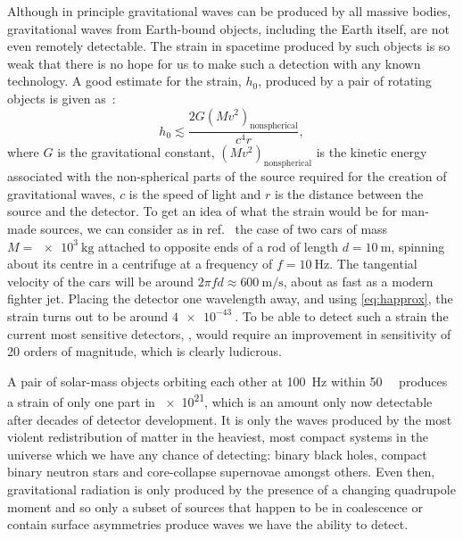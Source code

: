 Although in principle gravitational waves can be produced by all massive bodies, gravitational waves from Earth-bound objects, including the Earth itself, are not even remotely detectable. The strain in spacetime produced by such objects is so weak that there is no hope for us to make such a detection with any known technology. A good estimate for the strain, $h_0$, produced by a pair of rotating objects is given as~\cite{Sathyaprakash2009}:
\begin{equation}
  \label{eq:happrox}
  h_0 \lesssim \frac{2 G \left( M v^{2} \right)_{\text{nonspherical}}}{c^4 r},
\end{equation}
where $G$ is the gravitational constant, $\left( M v^{2} \right)_{\text{nonspherical}}$ is the kinetic energy associated with the non-spherical parts of the source required for the creation of gravitational waves, $c$ is the speed of light and $r$ is the distance between the source and the detector. To get an idea of what the strain would be for man-made sources, we can consider as in ref.~\cite{Sathyaprakash2009} the case of two cars of mass $M = \SI{e3}{\kilo\gram}$ attached to opposite ends of a rod of length $d = \SI{10}{\meter}$, spinning about its centre in a centrifuge at a frequency of $f = \SI{10}{\hertz}$. The tangential velocity of the cars will be around $2 \pi f d \approx \SI{600}{\meter\per\second}$, about as fast as a modern fighter jet. Placing the detector one wavelength away, and using \cref{eq:happrox}, the strain turns out to be around $\SI{4e-43}{}$. To be able to detect such a strain the current most sensitive detectors, \ALIGO{}, would require an improvement in sensitivity of \SI{20}{} orders of magnitude, which is clearly ludicrous.

A pair of solar-mass objects orbiting each other at \SI{100}{\hertz} within \SI{50}{\mega\lightyear} produces a strain of only one part in \SI{e21}{}, which is an amount only now detectable after decades of detector development. It is only the waves produced by the most violent redistribution of matter in the heaviest, most compact systems in the universe which we have any chance of detecting: binary black holes, compact binary neutron stars and core-collapse supernovae amongst others. Even then, gravitational radiation is only produced by the presence of a changing quadrupole moment and so only a subset of sources that happen to be in coalescence or contain surface asymmetries produce waves we have the ability to detect.

